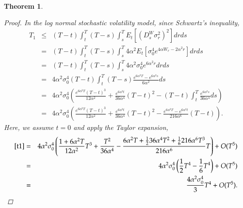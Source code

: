 \documentclass[11pt]{article}
\newtheorem{theorem}{Theorem}
\begin{document}
\begin{theorem}
\begin{proof}
In the log normal stochastic volatility model, since Schwartz's inequality,
\begin{eqnarray}
T_1 
&\le& 
(T-t)\int_{t}^{T}(T-s)\int_{s}^{T}E_{t}\left[\left(D_{s}^{W}\sigma _{r}^{2}\right)^{2}\right] dr ds \nonumber\\
&=&
(T-t)\int_{t}^{T}(T-s)\int_{s}^{T}4\alpha^2 E_{t}\left[ \sigma_0^4 e^{4\alpha W_r - 2\alpha^2 r}\right] dr ds \nonumber\\
&=&
(T-t)\int_{t}^{T}(T-s)\int_{s}^{T}4\alpha^2 \sigma_0^4 e^{6 \alpha^2 r} dr ds \nonumber\\
&=&
4\alpha^2 \sigma_0^4 (T-t)\int_{t}^{T}(T-s)\frac{e^{6 \alpha^2 T} - e^{6 \alpha^2 s}}{6\alpha^2} ds \nonumber\\
&=&
4\alpha^2 \sigma_0^4  \left(\frac{e^{6 \alpha^2 T}(T-t)^3}{12\alpha^2} + \frac{e^{6 \alpha^2 t}}{36\alpha^4}(T-t)^2 - (T-t)\int_t^T \frac{e^{6 \alpha^2 s}}{36\alpha^4}ds \right)\nonumber\\
&=&
4\alpha^2 \sigma_0^4  \left(\frac{e^{6 \alpha^2 T}(T-t)^3}{12\alpha^2} + \frac{e^{6 \alpha^2 t}}{36\alpha^4}(T-t)^2 - \frac{e^{6 \alpha^2 T} - e^{6 \alpha^2 t}}{216\alpha^6}(T-t) \right).\label{t1}
\end{eqnarray}
Here, we assume $t=0$ and apply the Taylor expansion,
\begin{eqnarray}
\eqref{t1}
&=& 
4\alpha^2 \sigma_0^4  \left(\frac{1+6\alpha^2T }{12\alpha^2}T^3 + \frac{T^2}{36\alpha^4} - \frac{6\alpha^2T + \frac{1}{2}36\alpha^4 T^2 + \frac{1}{6}216\alpha^6T^3}{216\alpha^6}T\right) + O(T^5)\nonumber\\
&=& 
4\alpha^2 \sigma_0^4  \left(\frac{1}{2}T^4 - \frac{1}{6}T^4\right) + O(T^5)\nonumber\\
&=& 
\frac{4 \alpha^2 \sigma_0^4}{3}T^4+O(T^5).
\end{eqnarray}


\end{proof}
\end{theorem}
\end{document}
